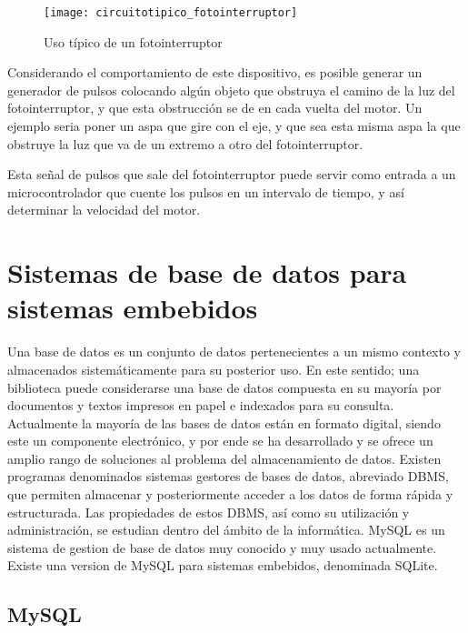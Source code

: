 \begin{figure}[h]
  \centering
  \texttt{[image: circuitotipico\_fotointerruptor]}
  \caption{Uso típico de un fotointerruptor}\label{fig:circuitotipico_fotointerruptor}
\end{figure}

Considerando el comportamiento de este dispositivo, es posible generar un generador de pulsos colocando algún objeto que obstruya el camino de la luz del fotointerruptor, y que esta obstrucción se de en cada vuelta del motor. Un ejemplo seria poner un aspa que gire con el eje, y que sea esta misma aspa la que obstruye la luz que va de un extremo a otro del fotointerruptor.

Esta señal de pulsos que sale del fotointerruptor puede servir como entrada a un microcontrolador que cuente los pulsos en un intervalo de tiempo, y así determinar la velocidad del motor.



\section{Sistemas de base de datos para sistemas embebidos} %
\label{sec:sistemas_de_base_de_datos_para_sistemas_embebidos}

Una base de datos es un conjunto de datos pertenecientes a un mismo contexto y almacenados sistemáticamente para su posterior uso. En este sentido; una biblioteca puede considerarse una base de datos compuesta en su mayoría por documentos y textos impresos en papel e indexados para su consulta. Actualmente la mayoría de las bases de datos están en formato digital, siendo este un componente electrónico, y por ende se ha desarrollado y se ofrece un amplio rango de soluciones al problema del almacenamiento de datos.
Existen programas denominados sistemas gestores de bases de datos, abreviado DBMS, que permiten almacenar y posteriormente acceder a los datos de forma rápida y estructurada. Las propiedades de estos DBMS, así como su utilización y administración, se estudian dentro del ámbito de la informática.
MySQL es un sistema de gestion de base de datos muy conocido y muy usado actualmente. Existe una version de MySQL para sistemas embebidos, denominada SQLite. 

\subsection{MySQL} %
\label{sub:mysql}

